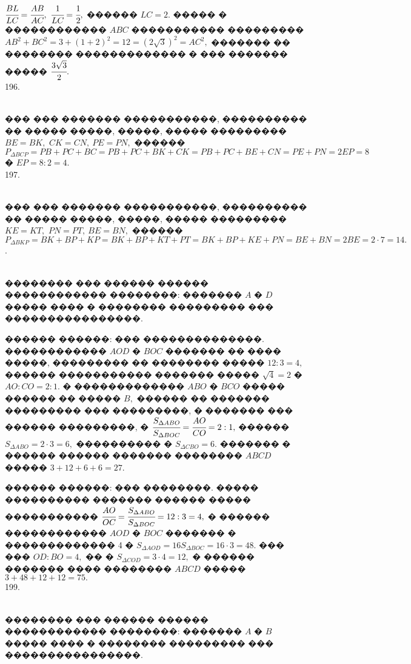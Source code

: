 \documentclass[12pt]{article}
\begin{document}
$\cfrac{BL}{LC}=\cfrac{AB}{AC},\ \cfrac{1}{LC}=\cfrac{1}{2},$ ������ $LC=2.$ ����� � ������������ $ABC$ ����������� ��������� $AB^2+BC^2=3+(1+2)^2=12=(2\sqrt{3})^2=AC^2,$ ������� �� �������� ������������� � ��� ������� ����� $\cfrac{3\sqrt{3}}{2}.$\\
196. \begin{figure}[ht!]
\end{figure}\\
��� ��� ������� �����������, ���������� �� ����� �����, �����, ����� ��������� $BE=BK,$ $CK=CN,\ PE=PN,$ ������ $P_{\Delta BCP}=PB+PC+BC=PB+PC+BK+CK=
PB+PC+BE+CN=PE+PN=2EP=8$ � $EP=8:2=4.$\\
197. \begin{figure}[ht!]
\end{figure}\\
��� ��� ������� �����������, ���������� �� ����� �����, �����, ����� ��������� $KE=KT,$ $PN=PT,\ BE=BN,$ ������ $P_{\Delta BKP}=BK+BP+KP=BK+BP+KT+PT=
BK+BP+KE+PN=BE+BN=2BE=2\cdot7=14.$\newpage{}. \begin{figure}[ht!]
\end{figure}\\
�������� ��� ������ ������ ������������ ��������: ������� $A$ � $D$ ����� ���� � �������� ��������� ��� ����������������.

������ ������: ��� ��������������. ������������ $AOD$ � $BOC$ ������� �� ���� �����, ��������� �� �������� ����� $12:3=4,$ ������ ����������� ������� ����� $\sqrt{4}=2$ � $AO:CO=2:1.$ � ������������� $ABO$ � $BCO$ ����� ������ �� ����� $B,$ ������ �� ������� ��������� ��� ���������, � ������� ��� ������ ���������, � $\cfrac{S_{\Delta ABO}}{S_{\Delta BOC}}=\cfrac{AO}{CO}=2:1,$ ������ $S_{\Delta ABO}=2\cdot3=6,$ ���������� � $S_{\Delta CBO}=6.$ ������� � ������ ������ ������� �������� $ABCD$ ����� $3+12+6+6=27.$

������ ������: ��� ��������. ����� ���������� ������� ������ ����� ����������� $\cfrac{AO}{OC}=\cfrac{S_{\Delta ABO}}{S_{\Delta BOC}}=12:3=4,$ � ������ ������������ $AOD$ � $BOC$ ������� � ������������� 4 � $S_{\Delta AOD}=16S_{\Delta BOC}=16\cdot3=48.$ ��� ��� $OD:BO=4,$ �� � $S_{\Delta COD}=3\cdot4=12,$ � ������ ������� ���� �������� $ABCD$ ����� $3+48+12+12=75.$\\
199. \begin{figure}[ht!]
\end{figure}\\
�������� ��� ������ ������ ������������ ��������: ������� $A$ � $B$ ����� ���� � �������� ��������� ��� ����������������.
\end{document}
